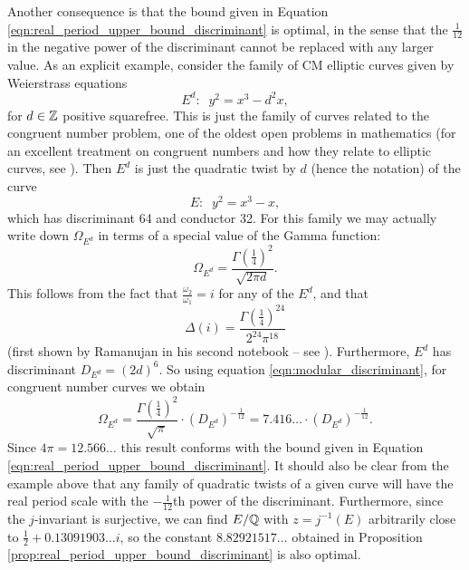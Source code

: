 Another consequence is that the bound given in Equation \ref{eqn:real_period_upper_bound_discriminant} is optimal, in the sense that the $\frac{1}{12}$ in the negative power of the discriminant cannot be replaced with any larger value. As an explicit example, consider the family of CM elliptic curves given by Weierstrass equations
\begin{equation}
E^d: \;\; y^2 = x^3 - d^2 x,
\end{equation}
for $d \in\mathbb{Z}$ positive squarefree. This is just the family of curves related to the congruent number problem, one of the oldest open problems in mathematics (for an excellent treatment on congruent numbers and how they relate to elliptic curves, see \cite{Kob-2012}). Then $E^{d}$ is just the quadratic twist by $d$ (hence the notation) of the curve
\begin{equation}
E: \;\; y^2 = x^3-x,
\end{equation}
which has discriminant 64 and conductor 32. For this family we may actually write down $\Omega_{E^d}$ in terms of a special value of the Gamma function:
\begin{equation}
\Omega_{E^d} = \frac{\Gamma(\frac{1}{4})^2}{\sqrt{2\pi d}}.
\end{equation}
This follows from the fact that $\frac{\omega_2}{\omega_1} = i$ for any of the $E^d$, and that
\begin{equation}
\Delta(i) = \frac{\Gamma(\frac{1}{4})^{24}}{2^{24}\pi^{18}}
\end{equation}
(first shown by Ramanujan in his second notebook -- see \cite{BeZh-1992}). Furthermore, $E^{d}$ has discriminant $D_{E^{d}} = (2d)^6$. So using equation \ref{eqn:modular_discriminant}, for congruent number curves we obtain
\begin{equation}
\Omega_{E^d} = \frac{\Gamma(\frac{1}{4})^2}{\sqrt{\pi}} \cdot (D_{E^d})^{-\frac{1}{12}} = 7.416\ldots \cdot (D_{E^d})^{-\frac{1}{12}}.
\end{equation}
Since $4\pi = 12.566\ldots$ this result conforms with the bound given in Equation \ref{eqn:real_period_upper_bound_discriminant}. It should also be clear from the example above that any family of quadratic twists of a given curve will have the real period scale with the $-\frac{1}{12}$th power of the discriminant. Furthermore, since the $j$-invariant is surjective, we can find $E/\mathbb{Q}$ with $z=j^{-1}(E)$ arbitrarily close to $\frac{1}{2}+0.13091903\ldots i$, so the constant $8.82921517\ldots$ obtained in Proposition \ref{prop:real_period_upper_bound_discriminant} is also optimal. \\

